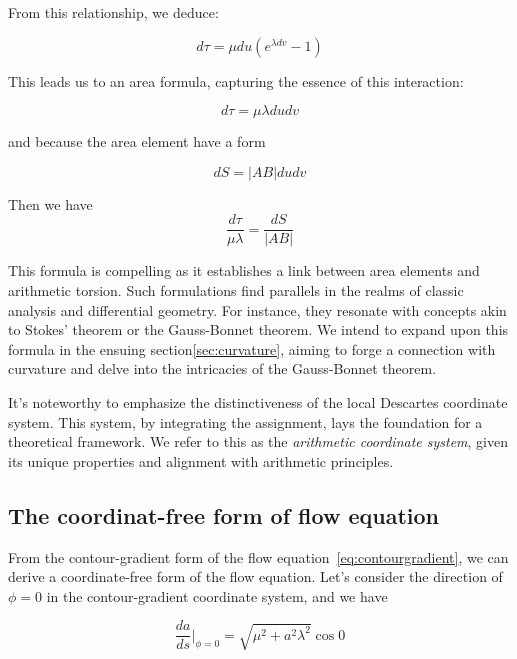 From this relationship, we deduce:

\begin{equation}
    d\tau = \mu du (e^{\lambda dv} - 1)
\end{equation}

This leads us to an area formula, capturing the essence of this interaction:

\begin{equation}
    d\tau = \mu \lambda du dv \label{eq:area_formula}
\end{equation}

and because the area element have a form

\begin{equation}
    dS = |AB| du dv \label{eq:area_element}
\end{equation}

Then we have
\begin{equation}
    \frac{d\tau}{\mu \lambda} = \frac{dS}{|AB|}\label{eq:area_formula2}
\end{equation}

This formula is compelling as it establishes a link between area elements and arithmetic torsion.
Such formulations find parallels in the realms of classic analysis and differential geometry.
For instance, they resonate with concepts akin to Stokes' theorem or the Gauss-Bonnet theorem.
We intend to expand upon this formula in the ensuing section\ref{sec:curvature},
aiming to forge a connection with curvature and delve into the intricacies of the Gauss-Bonnet theorem.

It's noteworthy to emphasize the distinctiveness of the local Descartes coordinate system.
This system, by integrating the assignment, lays the foundation for a theoretical framework.
We refer to this as the \emph{arithmetic coordinate system}, given its unique properties and alignment with arithmetic principles.

\subsection{The coordinat-free form of flow equation}\label{subsec:coordinate-free}

From the contour-gradient form of the flow equation~\eqref{eq:contourgradient}, we can derive a coordinate-free form of the flow equation.
Let's consider the direction of \(\phi = 0\) in the contour-gradient coordinate system, and we have

\[
    \frac{da}{ds}|_{\phi = 0} = \sqrt{\mu^2 + a^2 \lambda^2} \cos 0
\]

